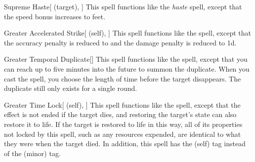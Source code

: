 \lowercase{\hypertarget{spell:Supreme Haste}{}}\label{spell:Supreme Haste}
\begin{attuneability}[Rank 6]{\hypertarget{spell:Supreme Haste}{Supreme Haste}}[ (target), ]
This spell functions like the \textit{haste} spell, except that the speed bonus increases to  feet.
\end{attuneability}
\vspace{0.25em}



\lowercase{\hypertarget{spell:Greater Accelerated Strike}{}}\label{spell:Greater Accelerated Strike}
\begin{attuneability}[Rank 7]{\hypertarget{spell:Greater Accelerated Strike}{Greater Accelerated Strike}}[ (self), ]
This spell functions like the  spell, except that the accuracy penalty is reduced to  and the damage penalty is reduced to \minus1d.
\end{attuneability}
\vspace{0.25em}



\lowercase{\hypertarget{spell:Greater Temporal Duplicate}{}}\label{spell:Greater Temporal Duplicate}
\begin{freeability}[Rank 8]{\hypertarget{spell:Greater Temporal Duplicate}{Greater Temporal Duplicate}}[]
This spell functions like the  spell, except that you can reach up to five minutes into the future to summon the duplicate.
When you cast the spell, you choose the length of time before the target disappears.
The duplicate still only exists for a single round.
\end{freeability}
\vspace{0.25em}



\lowercase{\hypertarget{spell:Greater Time Lock}{}}\label{spell:Greater Time Lock}
\begin{attuneability}[Rank 8]{\hypertarget{spell:Greater Time Lock}{Greater Time Lock}}[ (self), ]
This spell functions like the  spell, except that the effect is not ended if the target dies, and restoring the target's state can also restore it to life.
If the target is restored to life in this way, all of its properties not locked by this spell, such as any resources expended, are identical to what they were when the target died.
In addition, this spell has the  (self) tag instead of the  (minor) tag.
\end{attuneability}
\vspace{0.25em}



